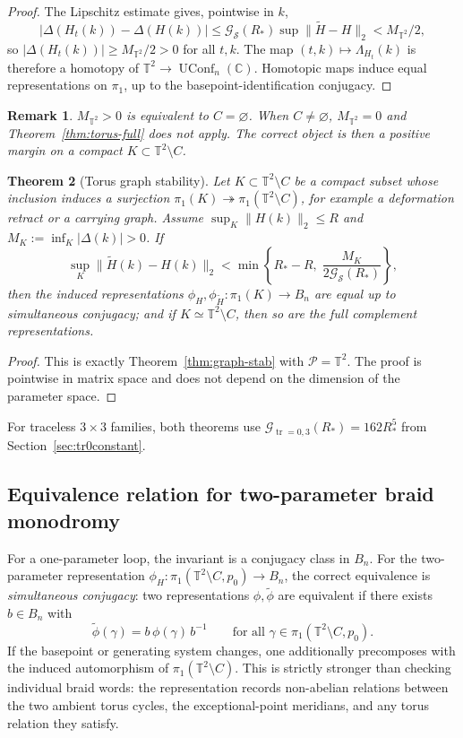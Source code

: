 \documentclass[11pt]{article}
\newtheorem{theorem}{Theorem}[section]
\newtheorem{remark}[theorem]{Remark}
\numberwithin{equation}{section}
\DeclareMathOperator{\UConf}{UConf}
\DeclareMathOperator{\tr}{tr}
\newcommand{\bbC}{\mathbb C}
\newcommand{\bbT}{\mathbb T}
\newcommand{\cG}{\mathcal G}
\newcommand{\cP}{\mathcal P}
\newcommand{\cS}{\mathcal S}
\begin{document}
\begin{proof}
The Lipschitz estimate gives, pointwise in \(k\),
\[
  |\Delta(H_t(k))-\Delta(H(k))|
  \le \cG_\cS(R_*)\sup\|\widetilde H-H\|_2
  < M_{\bbT^2}/2,
\]
so \(|\Delta(H_t(k))|\ge M_{\bbT^2}/2>0\) for all \(t,k\).  The
map \((t,k)\mapsto\Lambda_{H_t}(k)\) is therefore a homotopy of
\(\bbT^2\to\UConf_n(\bbC)\).  Homotopic maps induce equal representations
on \(\pi_1\), up to the basepoint-identification conjugacy.
\end{proof}

\begin{remark}
\(M_{\bbT^2}>0\) is equivalent to \(C=\varnothing\).  When \(C\neq\varnothing\),
\(M_{\bbT^2}=0\) and Theorem~\ref{thm:torus-full} does not apply.  The
correct object is then a positive margin on a compact
\(K\subset\bbT^2\setminus C\).
\end{remark}

\begin{theorem}[Torus graph stability]\label{thm:torus-graph}
Let \(K\subset\bbT^2\setminus C\) be a compact subset whose inclusion
induces a surjection \(\pi_1(K)\twoheadrightarrow\pi_1(\bbT^2\setminus C)\),
for example a deformation retract or a carrying graph.  Assume
\(\sup_K\|H(k)\|_2\le R\) and \(M_K:=\inf_K|\Delta(k)|>0\).  If
\[
  \sup_K\|\widetilde H(k)-H(k)\|_2
  <
  \min\!\left\{R_*-R,\;\frac{M_K}{2\cG_\cS(R_*)}\right\},
\]
then the induced representations
\(\phi_H,\phi_{\widetilde H}:\pi_1(K)\to B_n\)
are equal up to simultaneous conjugacy; and if \(K\simeq\bbT^2\setminus C\),
then so are the full complement representations.
\end{theorem}

\begin{proof}
This is exactly Theorem~\ref{thm:graph-stab} with \(\cP=\bbT^2\).  The
proof is pointwise in matrix space and does not depend on the dimension of
the parameter space.
\end{proof}

For traceless \(3\times3\) families, both theorems use
\(\cG_{\tr=0,3}(R_*)=162R_*^5\) from Section~\ref{sec:tr0constant}.

\subsection{Equivalence relation for two-parameter braid monodromy}

For a one-parameter loop, the invariant is a conjugacy class in \(B_n\).
For the two-parameter representation
\(\phi_H:\pi_1(\bbT^2\setminus C,p_0)\to B_n\),
the correct equivalence is \emph{simultaneous conjugacy}: two representations
\(\phi,\widetilde\phi\) are equivalent if there exists \(b\in B_n\) with
\[
  \widetilde\phi(\gamma)=b\,\phi(\gamma)\,b^{-1}
  \qquad\text{for all }\gamma\in\pi_1(\bbT^2\setminus C,p_0).
\]
If the basepoint or generating system changes, one additionally precomposes
with the induced automorphism of \(\pi_1(\bbT^2\setminus C)\).  This is
strictly stronger than checking individual braid words: the representation
records non-abelian relations between the two ambient torus cycles, the
exceptional-point meridians, and any torus relation they satisfy.
\end{document}
